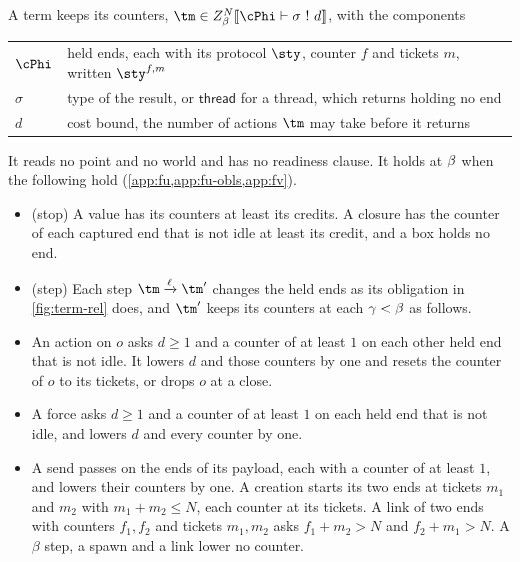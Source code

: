 \begin{definition}
\label{def:counters}
A term keeps its counters, $\tm \in \Fuel{N}{\ix}{\cPhi}{\sigma\ !\ d}$, with the components
\begin{center}
\small
\begin{tabular}{@{}l@{\quad}l@{}}
  $\cPhi$ & held ends, each with its protocol $\sty$, counter $f$ and tickets $m$, written $\sty^{f,m}$ \\
  $\sigma$ & type of the result, or $\mathsf{thread}$ for a thread, which returns holding no end \\
  $d$ & cost bound, the number of actions $\tm$ may take before it returns
\end{tabular}
\end{center}
It reads no point and no world and has no readiness clause. It holds at $\beta$ when the following hold (\cref{app:fu,app:fu-obls,app:fv}).
\begin{itemize}
  \item (stop) A value has its counters at least its credits. A closure has the counter of each captured end that is not idle at least its credit, and a box holds no end.
  \item (step) Each step $\tm \xrightarrow{\ell} \tm'$ changes the held ends as its obligation in \cref{fig:term-rel} does, and $\tm'$ keeps its counters at each $\gamma < \beta$ as follows.
  \item An action on $o$ asks $d \geq 1$ and a counter of at least $1$ on each other held end that is not idle. It lowers $d$ and those counters by one and resets the counter of $o$ to its tickets, or drops $o$ at a close.
  \item A force asks $d \geq 1$ and a counter of at least $1$ on each held end that is not idle, and lowers $d$ and every counter by one.
  \item A send passes on the ends of its payload, each with a counter of at least $1$, and lowers their counters by one. A creation starts its two ends at tickets $m_1$ and $m_2$ with $m_1 + m_2 \leq N$, each counter at its tickets. A link of two ends with counters $f_1, f_2$ and tickets $m_1, m_2$ asks $f_1 + m_2 > N$ and $f_2 + m_1 > N$. A $\beta$ step, a spawn and a link lower no counter.
\end{itemize}
\end{definition}

